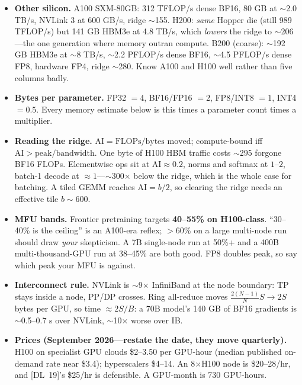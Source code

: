 \begin{itemize}[leftmargin=*,itemsep=1pt]
\item \textbf{Other silicon.} A100 SXM-80GB: 312 TFLOP/s dense BF16, 80 GB at
$\sim$2.0 TB/s, NVLink 3 at 600 GB/s, ridge $\sim$155. H200: \emph{same} Hopper
die (still 989 TFLOP/s) but 141 GB HBM3e at 4.8 TB/s, which \emph{lowers} the
ridge to $\sim$206---the one generation where memory outran compute. B200
(coarse): $\sim$192 GB HBM3e at $\sim$8 TB/s, $\sim$2.2 PFLOP/s dense BF16,
$\sim$4.5 PFLOP/s dense FP8, hardware FP4, ridge $\sim$280. Know A100 and H100
well rather than five columns badly.
\item \textbf{Bytes per parameter.} FP32 $=4$, BF16/FP16 $=2$, FP8/INT8 $=1$,
INT4 $=0.5$. Every memory estimate below is this times a parameter count times a
multiplier.
\item \textbf{Reading the ridge.} $\mathrm{AI} = \text{FLOPs}/\text{bytes
moved}$; compute-bound iff $\mathrm{AI} > \text{peak}/\text{bandwidth}$. One
byte of H100 HBM traffic costs $\sim$295 forgone BF16 FLOPs. Elementwise ops sit
at $\mathrm{AI}\approx0.2$, norms and softmax at $1$--$2$, batch-1 decode at
$\approx 1$---$\sim$300$\times$ below the ridge, which is the whole case for
batching. A tiled GEMM reaches $\mathrm{AI}=b/2$, so clearing the ridge needs an
effective tile $b \sim 600$.
\item \textbf{MFU bands.} Frontier pretraining targets \textbf{40--55\% on
H100-class}. ``30--40\% is the ceiling'' is an A100-era reflex; $>$60\% on a
large multi-node run should draw \emph{your} skepticism. A 7B single-node run at
50\%+ and a 400B multi-thousand-GPU run at 38--45\% are both good. FP8 doubles
peak, so say which peak your MFU is against.
\item \textbf{Interconnect rule.} NVLink is $\sim$9$\times$ InfiniBand at the
node boundary: TP stays inside a node, PP/DP crosses. Ring all-reduce moves
$\tfrac{2(N-1)}{N}S \to 2S$ bytes per GPU, so time $\approx 2S/B$: a 70B model's
140 GB of BF16 gradients is $\sim$0.5--0.7 s over NVLink, $\sim$10$\times$ worse
over IB.
\item \textbf{Prices (September 2026---restate the date, they move quarterly).}
H100 on specialist GPU clouds \$2--3.50 per GPU-hour (median published on-demand
rate near \$3.4); hyperscalers \$4--14. An 8$\times$H100 node is \$20--28/hr, and
[DL~19]'s \$25/hr is defensible. A GPU-month is 730 GPU-hours.
\end{itemize}

